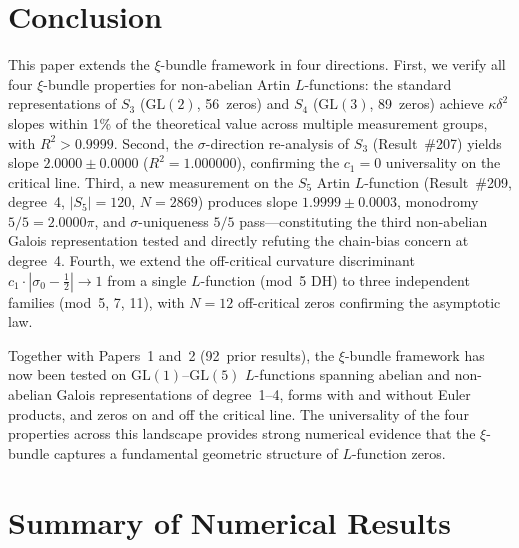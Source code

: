 \documentclass[11pt, a4paper]{article}
\theoremstyle{plain}
\theoremstyle{definition}
\newcommand{\abs}[1]{\left|#1\right|}
\newcommand{\kap}{\kappa}             %
\begin{document}
\section{Conclusion}
\label{sec:conclusion}

This paper extends the $\xi$-bundle framework in four directions.
First, we verify all four $\xi$-bundle properties for non-abelian
Artin $L$-functions: the standard representations of $S_{3}$
($\mathrm{GL}(2)$, 56~zeros) and $S_{4}$ ($\mathrm{GL}(3)$,
89~zeros) achieve $\kap\delta^{2}$ slopes within 1\% of the
theoretical value across multiple measurement groups, with
$R^{2} > 0.9999$.  Second, the $\sigma$-direction re-analysis of
$S_{3}$ (Result~\#207) yields slope $2.0000\pm0.0000$
($R^{2}=1.000000$), confirming the $c_{1}=0$ universality on
the critical line.  Third, a new measurement on the $S_{5}$ Artin
$L$-function (Result~\#209, degree~4, $|S_{5}|=120$, $N=2869$)
produces slope $1.9999\pm0.0003$, monodromy $5/5=2.0000\pi$, and
$\sigma$-uniqueness $5/5$ pass---constituting the third non-abelian
Galois representation tested and directly refuting the chain-bias
concern at degree~4.  Fourth, we extend the off-critical curvature
discriminant $c_{1}\cdot\abs{\sigma_{0}-\tfrac{1}{2}} \to 1$ from a
single $L$-function (mod~5 DH) to three independent families (mod~5,
7, 11), with $N=12$ off-critical zeros confirming the asymptotic law.

Together with Papers~1 and~2 (92~prior results), the $\xi$-bundle
framework has now been tested on $\mathrm{GL}(1)$--$\mathrm{GL}(5)$
$L$-functions spanning abelian and non-abelian Galois representations
of degree~1--4, forms with and without Euler products, and zeros on
and off the critical line.  The universality of the four properties
across this landscape provides strong numerical evidence that the
$\xi$-bundle captures a fundamental geometric structure of
$L$-function zeros.


\appendix

\section{Summary of Numerical Results}
\label{app:summary}
\end{document}
